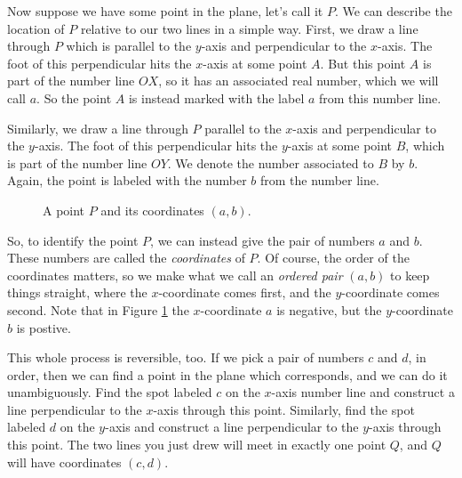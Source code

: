 \documentclass[00-livre-main.tex]{subfiles}
\begin{document}
Now suppose we have some point in the plane, let's call it $P$. 
We can describe the location of $P$ relative to our two lines in a simple way. First, we draw a line through $P$ which is parallel to the $y$-axis and perpendicular to the $x$-axis.
The foot of this perpendicular hits the $x$-axis at some point $A$.
But this point $A$ is part of the number line $OX$, so it has an associated real number, which we will call $a$.
So the point $A$ is instead marked with the label $a$ from this number line.

Similarly, we draw a line through $P$ parallel to the $x$-axis and perpendicular to the $y$-axis.
The foot of this perpendicular hits the $y$-axis at some point $B$, which is part of the number line $OY$.
We denote the number associated to $B$ by $b$. 
Again, the point is labeled with the number $b$ from the number line.

\begin{figure}[h!]
\centering
{}
\caption{A point $P$ and its coordinates $(a,b)$.}
\label{fig:point-coords}
\end{figure}

So, to identify the point $P$, we can instead give the pair of numbers $a$ and $b$. 
These numbers are called the \emph{coordinates} of $P$.
Of course, the order of the coordinates matters, so we make what we call an \emph{ordered pair} $(a,b)$ to keep things straight, where the $x$-coordinate comes first, and the $y$-coordinate comes second. Note that in Figure \ref{fig:point-coords} the $x$-coordinate $a$ is negative, but the $y$-coordinate $b$ is postive.

This whole process is reversible, too. If we pick a pair of numbers $c$ and $d$, in order, then we can find a point in the plane which corresponds, and we can do it unambiguously. Find the spot labeled $c$ on the $x$-axis number line and construct a line perpendicular to the $x$-axis through this point. Similarly, find the spot labeled $d$ on the $y$-axis and construct a line perpendicular to the $y$-axis through this point. The two lines you just drew will meet in exactly one point $Q$, and $Q$ will have coordinates $(c,d)$.
\end{document}
